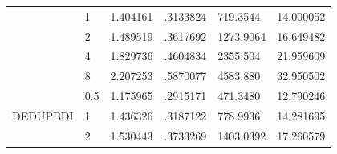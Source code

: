 \begin{table}[]
{\begin{tabular}{llllll}
    \multicolumn{1}{l|}{}                          & \multicolumn{1}{l|}{1}   & 1.404161                                                                          & .3133824                                                                               & 719.3544                                                                         & 14.000052                      \\
    \multicolumn{1}{l|}{}                          & \multicolumn{1}{l|}{2}   & 1.489519                                                                          & .3617692                                                                               & 1273.9064                                                                        & 16.649482                      \\
    \multicolumn{1}{l|}{}                          & \multicolumn{1}{l|}{4}   & 1.829736                                                                          & .4604834                                                                               & 2355.504                                                                         & 21.959609                      \\
    \multicolumn{1}{l|}{}                          & \multicolumn{1}{l|}{8}   & 2.207253                                                                          & .5870077                                                                               & 4583.880                                                                         & 32.950502                      \\ \cline{1-2}
    \multicolumn{1}{c|}{\multirow{5}{*}{DEDUPBDI}} & \multicolumn{1}{l|}{0.5} & 1.175965                                                                          & .2915171                                                                               & 471.3480                                                                         & 12.790246                      \\
    \multicolumn{1}{c|}{}                          & \multicolumn{1}{l|}{1}   & 1.436326                                                                          & .3187122                                                                               & 778.9936                                                                         & 14.281695                      \\
    \multicolumn{1}{c|}{}                          & \multicolumn{1}{l|}{2}   & 1.530443                                                                          & .3733269                                                                               & 1403.0392                                                                        & 17.260579                      \\

\end{tabular}}
\end{table}
